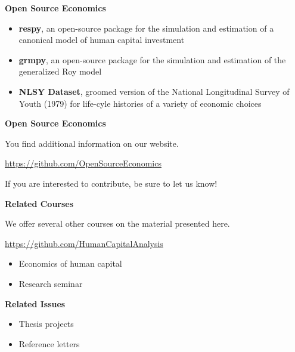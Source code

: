 \begin{frame}\textbf{Open Source Economics}\vspace{0.3cm}

\begin{itemize}\setlength\itemsep{1em}
\item \textbf{respy}, an open-source package for the simulation and estimation of a canonical model of human capital investment
\item \textbf{grmpy}, an open-source package for the simulation and estimation of the generalized Roy model
\item \textbf{NLSY Dataset}, groomed version of the National Longitudinal Survey of Youth (1979) for life-cyle histories of a variety of economic choices
\end{itemize}

\end{frame}
\begin{frame}
	\textbf{Open Source Economics}\vspace{0.3cm}

You find additional information on our website.

\begin{center}
\url{https://github.com/OpenSourceEconomics}
\end{center}

If you are interested to contribute, be sure to let us know!

\end{frame}
\begin{frame}
	\textbf{Related Courses}\vspace{0.3cm}

We offer several other courses on the material presented here.

	\begin{center}
	\url{https://github.com/HumanCapitalAnalysis}
	\end{center}


	\begin{itemize}\setlength\itemsep{1em}
	\item Economics of human capital
	\item Research seminar
	\end{itemize}

\end{frame}
\begin{frame}
	\textbf{Related Issues}\vspace{0.3cm}

	\begin{itemize}\setlength\itemsep{1em}
	\item Thesis projects
	\item Reference letters
	\end{itemize}
\end{frame}
